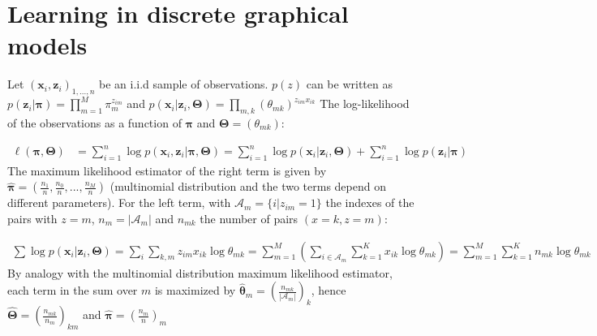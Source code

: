 \documentclass[9pt, oneside]{amsart}   	%
\title{}
\author{}
\date{}							%
\begin{document}
\section{Learning in discrete graphical models}
Let $(\mathbf{x}_i ,\mathbf{z}_i)_{1, ..., n}$ be an i.i.d sample of observations. $p(z)$ can be written as $p(\mathbf{z}_i|\bm{\pi}) = \prod_{m=1}^{M}\pi_m^{z_{im}}$ and $p(\mathbf{x}_i|\mathbf{z}_i, \bm{\Theta}) = \prod_{m,k}(\theta_{mk})^{z_{im}x_{ik}}$
The log-likelihood of the observations as a function of $\bm{\pi}$ and $\bm{\Theta} = (\theta_{mk})$:

\begin{align*}
	\ell(\bm{\pi}, \bm{\Theta}) &= \sum_{i=1}^n \log p(\mathbf{x}_i, \mathbf{z}_i|\bm{\pi}, \bm{\Theta}) = \sum_{i=1}^n\log p(\mathbf{x}_i|\mathbf{z}_i, \bm{\Theta}) + \sum_{i=1}^n \log p(\mathbf{z}_i|\bm{\pi})
\end{align*}
The maximum likelihood estimator of the right term is given by $\bm{\hat{\pi}} = (\frac{n_1}{n}, \frac{n_0}{n}, ..., \frac{n_M}{n})$ (multinomial distribution and the two terms depend on different parameters). For the left term, with $\mathcal{A}_m = \{i | z_{im}=1\}$ the indexes of the pairs with $z=m$, $n_m = |\mathcal{A}_m|$ and $n_{mk}$ the number of pairs $(x=k, z=m)$: 

\begin{align*}
	\sum\log p(\mathbf{x}_i|\mathbf{z}_i, \bm{\Theta}) = \sum_i\sum_{k,m} z_{im}x_{ik}\log\theta_{mk} = \sum_{m=1}^M \left(\sum_{i\in\mathcal{A}_m}\sum_{k=1}^K x_{ik}\log\theta_{mk}\right) = \sum_{m=1}^M  \sum_{k=1}^Kn_{mk}\log\theta_{mk}
\end{align*}
By analogy with the multinomial distribution maximum likelihood estimator, each term in the sum over $m$ is maximized by $\bm{\hat{\theta}}_m = \left(\frac{n_{mk}}{|\mathcal{A}_m|}\right)_k$, hence $\boxed{\bm{\hat{\Theta}}= \left(\frac{n_{mk}}{n_m}\right)_{km}}$ and $\boxed{\bm{\hat{\pi}} = \left(\frac{n_m}{n}\right)_m}$
\newline
\end{document}
